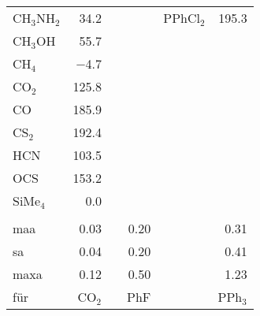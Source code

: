 \begin{table}[ht!]
\begin{tabular}{lr|lr|lr}
    CH$_{3}$NH$_{2}$ & 34.2  &       &  & PPhCl$_{2}$ & 195.3   \\
    CH$_{3}$OH & 55.7  &       &       &       &  \\
    CH$_{4}$   & $-$4.7  &       &       &       &  \\
    CO$_{2}$   & 125.8 &       &       &       &  \\
    CO    & 185.9 &       &       &       &  \\
    CS$_{2}$   & 192.4 &       &       &       &  \\
    HCN   & 103.5 &       &       &       &  \\
    OCS   & 153.2 &       &       &       &  \\
    SiMe$_{4}$ & 0.0   &       &       &       &  \\
          &       &       &       &       &  \\
    \ac{maa}   & 0.03   &    & 0.20   &       & 0.31 \\
    \ac{sa}   & 0.04   &    & 0.20   &       & 0.41 \\
    \ac{maxa} & 0.12 & & 0.50 & & 1.23\\
    für & CO$_2$ & & PhF & & PPh$_3$ 
    \end{tabular}%
  \label{tab:rierror}%
\end{table}%
\vfill
\newpage
\FloatBarrier
